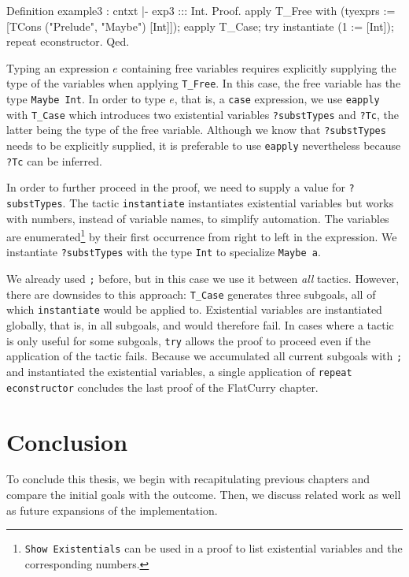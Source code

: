 \documentclass[paper = a4, fleqn, abstract=on, twoside]{scrreprt}
\begin{document}
\begin{coqcode}
Definition example3 : cntxt |- exp3 ::: Int.
  Proof.
  apply T_Free with (tyexprs := [TCons ("Prelude", "Maybe") [Int]]);
  eapply T_Case;
  try instantiate (1 := [Int]);
  repeat econstructor.
Qed.
\end{coqcode}
Typing an expression $e$ containing free variables requires explicitly supplying the type of the variables when applying \texttt{T\_Free}. In this case, the free variable has the type \texttt{Maybe Int}. In order to type $e$, that is, a \texttt{case} expression, we use \texttt{eapply} with \texttt{T\_Case} which introduces two existential variables \texttt{?substTypes} and \texttt{?Tc}, the latter being the type of the free variable. Although we know that \texttt{?substTypes} needs to be explicitly supplied, it is preferable to use \texttt{eapply} nevertheless because \texttt{?Tc} can be inferred.
\par
In order to further proceed in the proof, we need to supply a value for \texttt{?substTypes}. The tactic \texttt{instantiate} instantiates existential variables but works with numbers, instead of variable names, to simplify automation. The variables are enumerated\footnote{\texttt{Show Existentials} can be used in a proof to list existential variables and the corresponding numbers.} by their first occurrence from right to left in the expression. We instantiate \texttt{?substTypes} with the type \texttt{Int} to specialize \texttt{Maybe a}. 
\par
We already used \texttt{;} before, but in this case we use it between \textit{all} tactics. However, there are downsides to this approach: \texttt{T\_Case} generates three subgoals, all of which \texttt{instantiate} would be applied to. Existential variables are instantiated globally, that is, in all subgoals, and would therefore fail. In cases where a tactic is only useful for some subgoals, \texttt{try} allows the proof to proceed even if the application of the tactic fails. Because we accumulated all current subgoals with \texttt{;} and instantiated the existential variables, a single application of \texttt{repeat econstructor} concludes the last proof of the FlatCurry chapter.
\chapter{Conclusion}
To conclude this thesis, we begin with recapitulating previous chapters and compare the initial goals with the outcome. Then, we discuss related work as well as future expansions of the implementation.
\end{document}
